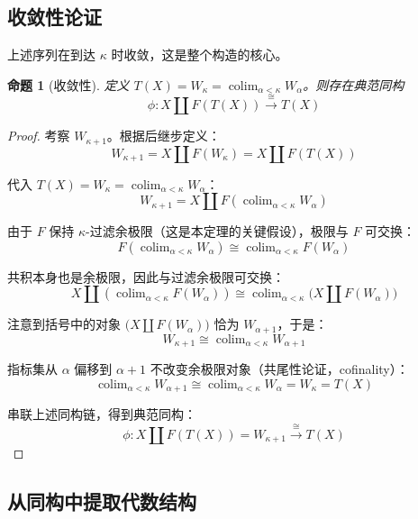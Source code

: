 \documentclass[UTF8,a4paper,12pt]{ctexart}
\theoremstyle{definition}
\theoremstyle{plain}
\newtheorem{proposition}{命题}[section]
\theoremstyle{remark}
\newcommand{\colim}{\operatorname{colim}}
\begin{document}
\subsection{收敛性论证}

上述序列在到达 $\kappa$ 时收敛，这是整个构造的核心。

\begin{proposition}[收敛性]
定义 $T(X) = W_\kappa = \colim_{\alpha < \kappa} W_\alpha$。则存在典范同构
\[
\phi: X \coprod F(T(X)) \xrightarrow{\cong} T(X)
\]
\end{proposition}

\begin{proof}
考察 $W_{\kappa+1}$。根据后继步定义：
\[
W_{\kappa+1} = X \coprod F(W_\kappa) = X \coprod F(T(X))
\]

代入 $T(X) = W_\kappa = \colim_{\alpha < \kappa} W_\alpha$：
\[
W_{\kappa+1} = X \coprod F\!\left(\colim_{\alpha < \kappa} W_\alpha\right)
\]

由于 $F$ 保持 $\kappa$-过滤余极限（这是本定理的关键假设），极限与 $F$ 可交换：
\[
F\!\left(\colim_{\alpha < \kappa} W_\alpha\right) \cong \colim_{\alpha < \kappa} F(W_\alpha)
\]

共积本身也是余极限，因此与过滤余极限可交换：
\[
X \coprod \left(\colim_{\alpha < \kappa} F(W_\alpha)\right) \cong \colim_{\alpha < \kappa} \bigl(X \coprod F(W_\alpha)\bigr)
\]

注意到括号中的对象 $\bigl(X \coprod F(W_\alpha)\bigr)$ 恰为 $W_{\alpha+1}$，于是：
\[
W_{\kappa+1} \cong \colim_{\alpha < \kappa} W_{\alpha+1}
\]

指标集从 $\alpha$ 偏移到 $\alpha+1$ 不改变余极限对象（共尾性论证，cofinality）：
\[
\colim_{\alpha < \kappa} W_{\alpha+1} \cong \colim_{\alpha < \kappa} W_\alpha = W_\kappa = T(X)
\]

串联上述同构链，得到典范同构：
\[
\phi: X \coprod F(T(X)) = W_{\kappa+1} \xrightarrow{\cong} T(X)
\]
\end{proof}

\subsection{从同构中提取代数结构}
\end{document}
